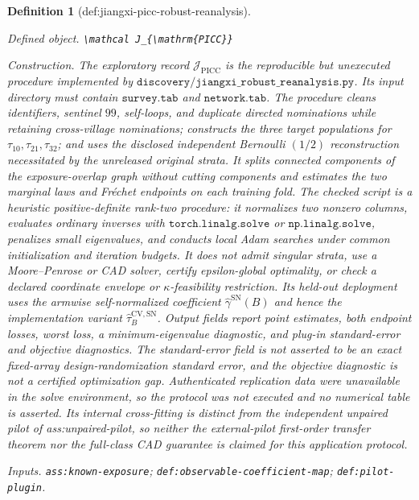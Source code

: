\documentclass{article}
\newtheorem{definition}{Definition}
\begin{document}
\begin{definition}[def:jiangxi-picc-robust-reanalysis]\label{def:jiangxi-picc-robust-reanalysis}
\par\smallskip\noindent\emph{Defined object.} \texttt{\textbackslash{}\allowbreak{}mathcal J\_\allowbreak{}\{\textbackslash{}\allowbreak{}mathrm\{PICC\}\allowbreak{}\}\allowbreak{}}
\par\smallskip\noindent\emph{Construction.} The exploratory record \(\mathcal J_{\mathrm{PICC}}\) is the reproducible but unexecuted procedure implemented by \(\texttt{discovery/jiangxi\_robust\_reanalysis.py}\).  Its input directory must contain \(\texttt{survey.tab}\) and \(\texttt{network.tab}\).  The procedure cleans identifiers, sentinel \(99\), self-loops, and duplicate directed nominations while retaining cross-village nominations; constructs the three target populations for \(\tau_{10},\tau_{21},\tau_{32}\); and uses the disclosed independent Bernoulli \((1/2)\) reconstruction necessitated by the unreleased original strata.  It splits connected components of the exposure-overlap graph without cutting components and estimates the two marginal laws and Fr\'echet endpoints on each training fold.  The checked script is a heuristic positive-definite rank-two procedure: it normalizes two nonzero columns, evaluates ordinary inverses with \(\texttt{torch.linalg.solve}\) or \(\texttt{np.linalg.solve}\), penalizes small eigenvalues, and conducts local Adam searches under common initialization and iteration budgets.  It does not admit singular strata, use a Moore--Penrose or CAD solver, certify epsilon-global optimality, or check a declared coordinate envelope or \(\kappa\)-feasibility restriction.  Its held-out deployment uses the armwise self-normalized coefficient \(\widehat\gamma^{\mathrm{SN}}(B)\) and hence the implementation variant \(\widehat\tau_B^{\mathrm{CV,SN}}\).  Output fields report point estimates, both endpoint losses, worst loss, a minimum-eigenvalue diagnostic, and plug-in standard-error and objective diagnostics.  The standard-error field is not asserted to be an exact fixed-array design-randomization standard error, and the objective diagnostic is not a certified optimization gap.  Authenticated replication data were unavailable in the solve environment, so the protocol was not executed and no numerical table is asserted.  Its internal cross-fitting is distinct from the independent unpaired pilot of ass:unpaired-pilot, so neither the external-pilot first-order transfer theorem nor the full-class CAD guarantee is claimed for this application protocol.
\par\smallskip\noindent\emph{Inputs.} \texttt{ass:\allowbreak{}known-\allowbreak{}exposure}; \texttt{def:\allowbreak{}observable-\allowbreak{}coefficient-\allowbreak{}map}; \texttt{def:\allowbreak{}pilot-\allowbreak{}plugin}.
\end{definition}
\end{document}

